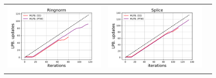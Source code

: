 \begin{figure}[p]
\begin{tabular}{ccc}
\begin{minipage}[t]{0.31\hsize}
            \includegraphics[keepaspectratio, scale=0.30]
            {figure/mlpb_lpb_update_ringnorm.pdf}
        \end{minipage}
        &
        \begin{minipage}[t]{0.31\hsize}
            \centering
            \includegraphics[keepaspectratio, scale=0.30]
            {figure/mlpb_lpb_update_splice.pdf}
        \end{minipage}
        \\
        \begin{minipage}[t]{0.31\hsize}
            \centering
            \includegraphics[keepaspectratio, scale=0.30]

\end{minipage}
\end{tabular}
\end{figure}
